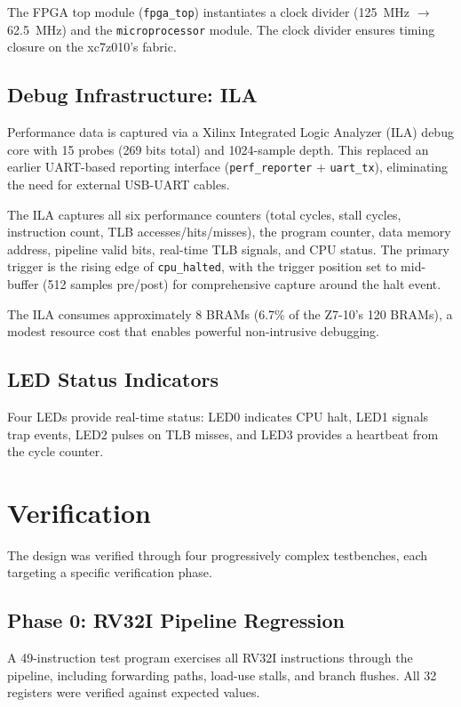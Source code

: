 \documentclass[conference]{IEEEtran}
\begin{document}
The FPGA top module (\texttt{fpga\_top}) instantiates a clock divider (125~MHz $\rightarrow$ 62.5~MHz) and the \texttt{microprocessor} module. The clock divider ensures timing closure on the xc7z010's fabric.

\subsection{Debug Infrastructure: ILA}

Performance data is captured via a Xilinx Integrated Logic Analyzer (ILA) debug core with 15 probes (269 bits total) and 1024-sample depth. This replaced an earlier UART-based reporting interface (\texttt{perf\_reporter} + \texttt{uart\_tx}), eliminating the need for external USB-UART cables.

The ILA captures all six performance counters (total cycles, stall cycles, instruction count, TLB accesses/hits/misses), the program counter, data memory address, pipeline valid bits, real-time TLB signals, and CPU status. The primary trigger is the rising edge of \texttt{cpu\_halted}, with the trigger position set to mid-buffer (512 samples pre/post) for comprehensive capture around the halt event.

The ILA consumes approximately 8 BRAMs (6.7\% of the Z7-10's 120 BRAMs), a modest resource cost that enables powerful non-intrusive debugging.

\subsection{LED Status Indicators}

Four LEDs provide real-time status: LED0 indicates CPU halt, LED1 signals trap events, LED2 pulses on TLB misses, and LED3 provides a heartbeat from the cycle counter.

\section{Verification}

The design was verified through four progressively complex testbenches, each targeting a specific verification phase.

\subsection{Phase 0: RV32I Pipeline Regression}

A 49-instruction test program exercises all RV32I instructions through the pipeline, including forwarding paths, load-use stalls, and branch flushes. All 32 registers were verified against expected values.
\end{document}
